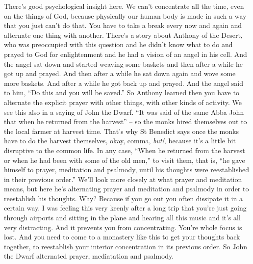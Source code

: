 There's good psychological insight here. We can't concentrate all the time, even on the things of God, because physically our human body is made in such a way that you just can't do that. You have to take a break every now and again and alternate one thing with another. There's a story about Anthony of the Desert, who was preoccupied with this question and he didn't know what to do and prayed to God for enlightenment and he had a vision of an angel in his cell. And the angel sat down and started weaving some baskets and then after a while he got up and prayed. And then after a while he sat down again and wove some more baskets. And after a while he got back up and prayed. And the angel said to him, ``Do this and you will be saved.'' So Anthony learned then you have to alternate the explicit prayer with other things, with other kinds of activity. We see this also in a saying of John the Dwarf. ``It was said of the same Abba John that when he returned from the harvest'' -- so the monks hired themselves out to the local farmer at harvest time. That's why St Benedict says once the monks have to do the harvest themselves, okay, comma, \emph{but!}, because it's a little bit disruptive to the common life. In any case, ``When he returned from the harvest or when he had been with some of the old men,'' to visit them, that is, ``he gave himself to prayer, meditation and psalmody, until his thoughts were reestablished in their previous order.'' We'll look more closely at what prayer and meditation means, but here he's alternating prayer and meditation and psalmody in order to reestablish his thoughts. Why? Because if you go out you often dissipate it in a certain way. I was feeling this very keenly after a long trip that you're just going through airports and sitting in the plane and hearing all this music and it's all very distracting. And it prevents you from concentrating. You're whole focus is lost. And you need to come to a monastery like this to get your thoughts back together, to reestablish your interior concentration in its previous order. So John the Dwarf alternated prayer, mediatation and psalmody.

